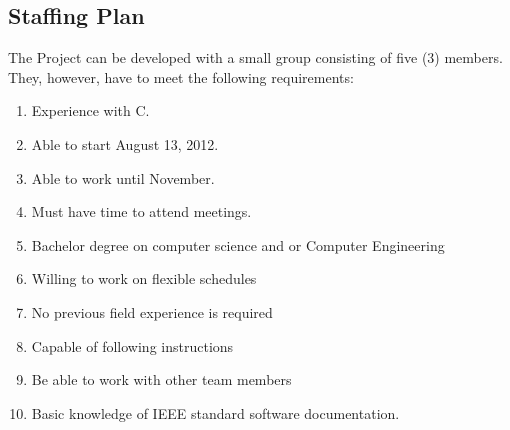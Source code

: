 \documentclass[12pt]{article}
\begin{document}
\subsection{Staffing Plan}
The Project can be developed with a small group consisting of five (3) members. They, however, have to meet the following requirements:
\begin{enumerate}
  \item Experience with C.
  \item Able to start August 13, 2012.
  \item Able to work until November.
  \item Must have time to attend meetings.
  \item Bachelor degree on computer science and or Computer Engineering
  \item Willing to work on flexible schedules
  \item No previous field experience is required
  \item Capable of following instructions
  \item Be able to work with other team members
  \item Basic knowledge of IEEE standard software documentation.

\end{enumerate}
\end{document}
